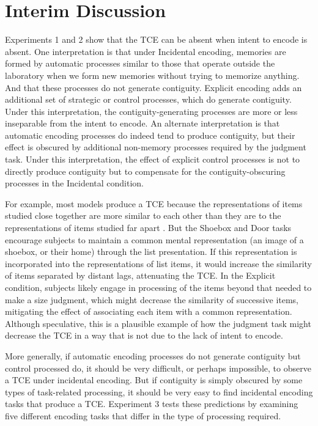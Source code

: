 \documentclass[jou,natbib]{apa6} %
\begin{document}
\section{Interim Discussion}

Experiments 1 and 2 show that the TCE can be absent when intent to encode is absent. One interpretation is that under Incidental encoding, memories are formed by automatic processes similar to those that operate outside the laboratory when we form new memories without trying to memorize anything. And that these processes do not generate contiguity. Explicit encoding adds an additional set of strategic or control processes, which do generate contiguity. Under this interpretation, the contiguity-generating processes are more or less inseparable from the intent to encode. An alternate interpretation is that automatic encoding processes do indeed tend to produce contiguity, but their effect is obscured by additional non-memory processes required by the judgment task. Under this interpretation, the effect of explicit control processes is not to directly produce contiguity but to compensate for the contiguity-obscuring processes in the Incidental condition. 

For example, most models produce a TCE because the representations of items studied close together are more similar to each other than they are to the representations of items studied far apart  \citep{HealEtal16}. But the Shoebox and Door tasks encourage subjects to maintain a common mental representation (an image of a shoebox, or their home) through the list presentation. If this representation is incorporated into the representations of list items, it would increase the similarity of items separated by distant lags, attenuating the TCE. In the Explicit condition, subjects likely engage in processing of the items beyond that needed to make a size judgment, which might decrease the similarity of successive items, mitigating the effect of associating each item with a common representation. Although speculative, this is a plausible example of how the judgment task might decrease the TCE in a way that is not due to the lack of intent to encode.      

More generally, if automatic encoding processes do not generate contiguity but control processed do, it should be very difficult, or perhaps impossible, to observe a TCE under incidental encoding. But if contiguity is simply obscured by some types of task-related processing, it should be very easy to find incidental encoding tasks that produce a TCE. Experiment 3 tests these predictions by examining five different encoding tasks that differ in the type of processing required.  
\end{document}
